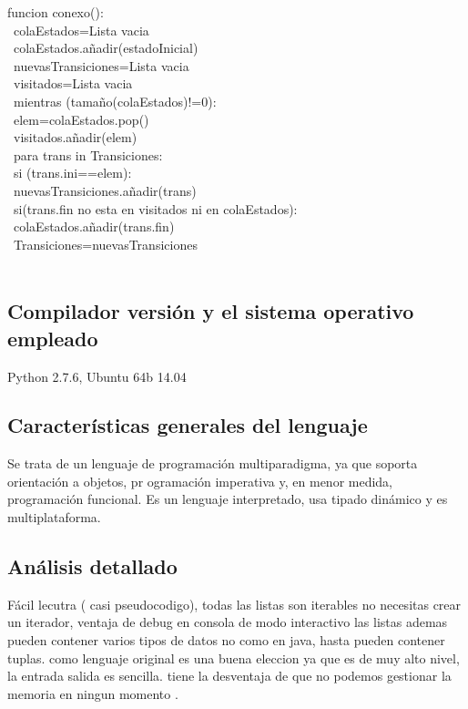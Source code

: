\documentclass[]{scrartcl}
\begin{document}
funcion conexo():\\ \
\indent    colaEstados=Lista vacia\\ \
\indent    colaEstados.añadir(estadoInicial)\\ \
\indent    nuevasTransiciones=Lista vacia\\ \
\indent    visitados=Lista vacia\\ \
\indent    mientras (tamaño(colaEstados)!=0):\\ \
\indent\indent      elem=colaEstados.pop()\\ \
\indent\indent      visitados.añadir(elem)\\ \
\indent\indent      para trans in Transiciones:\\ \
\indent\indent\indent        si (trans.ini==elem):\\ \
\indent\indent\indent\indent          nuevasTransiciones.añadir(trans)\\ \
\indent\indent\indent          si(trans.fin no esta en  visitados ni en colaEstados):\\ \
 \indent\indent\indent\indent           colaEstados.añadir(trans.fin)\\ \
 \indent   Transiciones=nuevasTransiciones\\ \
 \subsection{Compilador versi\'on y el sistema operativo empleado}
 Python 2.7.6, Ubuntu 64b 14.04
  \subsection{Caracter\'isticas generales del lenguaje}
  Se trata de un lenguaje de programación multiparadigma, ya que soporta orientación a objetos, pr																												ogramación imperativa y, en menor medida, programación funcional. Es un lenguaje interpretado, usa tipado dinámico y es multiplataforma.
  \subsection{An\'alisis detallado}
  F\'acil lecutra ( casi pseudocodigo), todas las listas son iterables no necesitas crear un iterador, ventaja de debug en consola de modo interactivo
  las listas ademas pueden contener varios tipos de datos no como en java, hasta pueden contener tuplas. como lenguaje original es una buena eleccion ya
   que es de muy alto nivel, la entrada salida es sencilla. tiene la desventaja de que no podemos gestionar la memoria en ningun momento .
  
\end{document}
